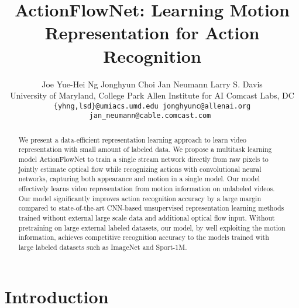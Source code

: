 \documentclass[10pt,twocolumn,letterpaper]{article}
\begin{document}
\title{ActionFlowNet: Learning Motion Representation for Action Recognition}
\author{
  Joe Yue-Hei Ng \hspace{1em}
  Jonghyun Choi \hspace{1em}
  Jan Neumann \hspace{1em}
  Larry S. Davis \vspace{.3em}
  \\
  University of Maryland, College Park \hspace{1.5em}
  Allen Institute for AI \hspace{1.5em}
  Comcast Labs, DC \vspace{.3em}\\
{\tt\small \{yhng,lsd\}@umiacs.umd.edu \hspace{1em}
jonghyunc@allenai.org \hspace{1em}
jan\_neumann@cable.comcast.com }
}

\maketitle
\ifwacvfinal\thispagestyle{empty}\fi

\begin{abstract}


We present a data-efficient representation learning approach to learn video representation with small amount of labeled data.
We propose a multitask learning model ActionFlowNet to train a single stream network directly from raw pixels to jointly estimate optical flow while recognizing actions with convolutional neural networks, capturing both appearance and motion in a single model.
Our model effectively learns video representation from motion information on unlabeled videos.
Our model significantly improves action recognition accuracy by a large margin  compared to state-of-the-art CNN-based unsupervised representation learning methods trained without external large scale data and additional optical flow input.
Without pretraining on large external labeled datasets, our model, by well exploiting the motion information, achieves competitive recognition accuracy to the models trained with large labeled datasets such as ImageNet and Sport-1M.


 \end{abstract}




\section{Introduction}
\label{sec:intro}
\end{document}

